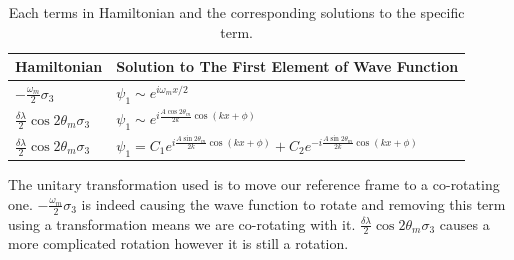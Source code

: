 \begin{table}
\caption{\label{chap:matter-sec:deep-jacobi-subsec:single-matter-freq-tab:decomp-hamil}Each terms in Hamiltonian and the corresponding solutions to the specific term.}
\setlength\tabcolsep{2pt}
\begin{tabular}{l|l}
\hline
 Hamiltonian &   Solution to The First Element of Wave Function \\
\hline
   $-\frac{\omega_m}{2}\sigma_3$ &  $\psi_1 \sim e^{i\omega_m x/2}$  \\
   $\frac{\delta\lambda}{2}\cos 2\theta_m \sigma_3$     &   $\psi_1 \sim e^{i\frac{A\cos 2\theta_m}{2k}\cos(kx+\phi)}$ \\
  $\frac{\delta\lambda}{2}\cos 2\theta_m \sigma_3$     &   $\psi_1 = C_1 e^{i\frac{A\sin 2\theta_m}{2k}\cos(kx+\phi)} + C_2 e^{-i\frac{A\sin 2\theta_m}{2k}\cos(kx+\phi)}$ \\
\hline

\end{tabular}
\end{table}




The unitary transformation used is to move our reference frame to a co-rotating one. $-\frac{\omega_m}{2}\sigma_3$ is indeed causing the wave function to rotate and removing this term using a transformation means we are co-rotating with it. $\frac{\delta\lambda}{2}\cos 2\theta_m \sigma_3$ causes a more complicated rotation however it is still a rotation.

